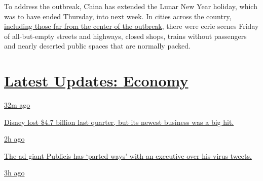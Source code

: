 To address the outbreak, China has extended the Lunar New Year holiday,
which was to have ended Thursday, into next week. In cities across the
country,
\href{https://www.nytimes.com/2020/01/25/world/asia/china-wuhan-coronavirus.html?searchResultPosition=2}{including
those far from the center of the outbreak}, there were eerie scenes
Friday of all-but-empty streets and highways, closed shops, trains
without passengers and nearly deserted public spaces that are normally
packed.

\hypertarget{latest-updates-economy}{%
\section{\texorpdfstring{\href{https://www.nytimes.com/live/2020/08/04/business/stock-market-today-coronavirus?action=click\&pgtype=Article\&state=default\&region=MAIN_CONTENT_1\&context=storylines_live_updates}{Latest
Updates:
Economy}}{Latest Updates: Economy}}\label{latest-updates-economy}}

\href{https://www.nytimes.com/live/2020/08/04/business/stock-market-today-coronavirus?action=click\&pgtype=Article\&state=default\&region=MAIN_CONTENT_1\&context=storylines_live_updates\#disney-lost-4-7-billion-last-quarter-but-its-newest-business-was-a-big-hit}{32m
ago}

\href{https://www.nytimes.com/live/2020/08/04/business/stock-market-today-coronavirus?action=click\&pgtype=Article\&state=default\&region=MAIN_CONTENT_1\&context=storylines_live_updates\#disney-lost-4-7-billion-last-quarter-but-its-newest-business-was-a-big-hit}{Disney
lost \$4.7 billion last quarter, but its newest business was a big hit.}

\href{https://www.nytimes.com/live/2020/08/04/business/stock-market-today-coronavirus?action=click\&pgtype=Article\&state=default\&region=MAIN_CONTENT_1\&context=storylines_live_updates\#the-ad-giant-publicis-has-parted-ways-with-an-executive-over-his-virus-tweets}{2h
ago}

\href{https://www.nytimes.com/live/2020/08/04/business/stock-market-today-coronavirus?action=click\&pgtype=Article\&state=default\&region=MAIN_CONTENT_1\&context=storylines_live_updates\#the-ad-giant-publicis-has-parted-ways-with-an-executive-over-his-virus-tweets}{The
ad giant Publicis has `parted ways' with an executive over his virus
tweets.}

\href{https://www.nytimes.com/live/2020/08/04/business/stock-market-today-coronavirus?action=click\&pgtype=Article\&state=default\&region=MAIN_CONTENT_1\&context=storylines_live_updates\#nbcuniversal-to-cut-about-10-percent-of-its-work-force}{3h
ago}

